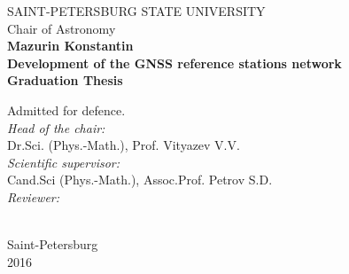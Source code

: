 \documentclass[a4paper,12pt]{report}
\begin{document}
\begin{titlepage}
\begin{center}
{\large SAINT-PETERSBURG STATE UNIVERSITY \\[6mm] Chair of Astronomy }\\
\vspace{2cm}
{\Large \bf Mazurin Konstantin } \\
\vspace{2cm}
{\LARGE \bf Development of the GNSS reference stations network } \\
\vspace{2cm}
{\large \bf Graduation Thesis } \\[12mm]
\end{center}

\begin{flushright}
{ \large Admitted for defence. \\[4mm]
{\it Head of the chair:} \\
Dr.Sci. (Phys.-Math.), Prof. {\Large Vityazev V.V.}\\ [4mm]
{\it Scientific supervisor:} \\
Cand.Sci (Phys.-Math.), Assoc.Prof. {\Large Petrov S.D.}\\ [4mm]
{\it Reviewer:} \\
\\ }
\end{flushright}
\vspace{5cm}
\begin{center}
{\large Saint-Petersburg \\[5mm] 2016}
\end{center}
\end{titlepage}

{\large\tableofcontents}
\newpage

\large
\end{document}
